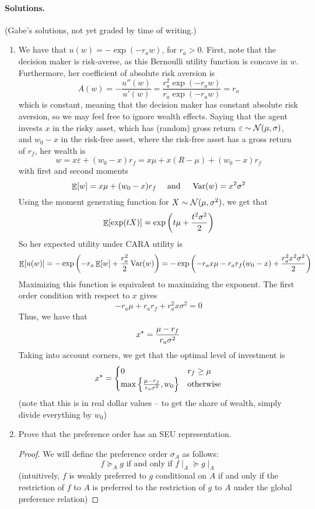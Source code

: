 \documentclass[12pt]{article}
\begin{document}
\paragraph{Solutions.} (Gabe's solutions, not yet graded by time of writing.)

\begin{enumerate}
	\item We have that $u(w) = -\exp(-r_a w)$, for $r_a > 0$. First, note that the decision maker is risk-averse, as this Bernoulli utility function is concave in $w$. Furthermore, her coefficient of absolute risk aversion is
	\[
	A(w) = -\frac{u''(w)}{u'(w)} = \frac{r_a^2 \exp(-r_a w)}{r_a \exp(-r_a w)} = r_a
	\]
	which is constant, meaning that the decision maker has constant absolute risk aversion, so we may feel free to ignore wealth effects. Saying that the agent invests $x$ in the risky asset, which has (random) gross return $\varepsilon \sim \mathcal{N}(\mu,\sigma)$, and $w_0 - x$ in the risk-free asset, where the risk-free asset has a gross return of $r_f$, her wealth is
	\[
	w = x \varepsilon + (w_0 - x) r_f = x \mu + x (R - \mu) + (w_0 - x)r_f
	\]
	with first and second moments
	\[
	\mathop{\mathbb{E}}[w] = x\mu + (w_0 - x)r_f \quad \text{ and } \quad \mathop{\rm Var}(w) = x^2 \sigma^2
	\]
	Using the moment generating function for $X \sim \mathcal{N}(\mu,\sigma^2)$, we get that
	\[
	\mathop{\mathbb{E}}[\exp(tX)] = \exp\left( t \mu + \frac{t^2\sigma^2}{2}\right)
	\] 
	So her expected utility under CARA utility is
	\[
	\mathop{\mathbb{E}}[u(w)] = -\exp \left( -r_a \mathop{\mathbb{E}}[w] + \frac{r_a^2}{2}\mathop{\rm Var}(w)\right) = -\exp\left( -r_ax\mu - r_ar_f(w_0 - x) + \frac{r_a^2x^2\sigma^2}{2}\right)
	\]
	Maximizing this function is equivalent to maximizing the exponent. The first order condition with respect to $x$ gives
	\[
	-r_a \mu + r_a r_f + r_a^2 x\sigma^2 = 0
	\]
	Thus, we have that
	\[
	x^\star = \frac{\mu - r_f}{r_a \sigma^2}
	\]
	Taking into account corners, we get that the optimal level of investment is
	\[
	x^\star = \begin{cases} 0 & r_f \ge \mu \\ \max\left\{ \frac{\mu - r_f}{r_a \sigma^2},w_0 \right\} & \text{otherwise} \end{cases}
	\]
	(note that this is in real dollar values -- to get the share of wealth, simply divide everything by $w_0$)
	\item Prove that the preference order has an SEU representation.
	
	\begin{proof}
		We will define the preference order $\sigma_A$ as follows:
		\[
		f \succeq_A g \text{ if and only if } f\mid_A \succeq g \mid_A
		\]
		(intuitively, $f$ is weakly preferred to $g$ conditional on $A$ if and only if the restriction of $f$ to $A$ is preferred to the restriction of $g$ to $A$ under the global preference relation)
		

\end{proof}
\end{enumerate}
\end{document}
